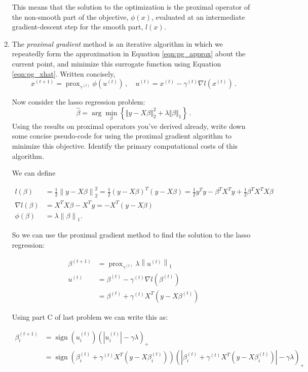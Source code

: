 \documentclass{article}
\DeclareMathOperator*{\sign}{sign}
\DeclareMathOperator*{\prox}{prox}
\newcommand{\norm}[1]{\left\lVert#1\right\rVert}
\newcommand{\enorm}[1]{\Vert #1 \Vert_2}
\begin{document}
\begin{enumerate}[label=(\Alph*)]
{This means that the solution to the optimization is the proximal operator of the non-smooth part of the objective, $\phi(x)$, evaluated at an intermediate gradient-descent step for the smooth part, $l(x)$.

}





\item The \textit{proximal gradient} method is an iterative algorithm in which we repeatedly form the approximation in Equation \ref{eqn:pg_approx} about the current point, and minimize this surrogate function using Equation \ref{eqn:pg_xhat}.  Written concisely,
$$
x^{(t+1)} = \prox_{\gamma^{(t)}} \phi(u^{(t)}) \, , \quad u^{(t)} = x^{(t)} - \gamma^{(t)} \nabla l(x^{(t)}) \, .
$$

Now consider the lasso regression problem:
$$
\hat{\beta} = \arg \min_{\beta} \left\{  \enorm{y - X\beta}^2 + \lambda \Vert \beta \Vert_1 \right\} \, .
$$
Using the results on proximal operators you've derived already, write down some concise pseudo-code for using the proximal gradient algorithm to minimize this objective.  Identify the primary computational costs of this algorithm.

\bigskip
{\color{blue}
We can define 

\begin{align}
l(\beta) &= \frac{1}{2}\norm{y - X\beta}^2_2 = \frac{1}{2}(y - X\beta)^T (y - X\beta) = \frac{1}{2}y^Ty - \beta^T X^T y + \frac{1}{2} \beta^T X^T X \beta \\
\nabla l(\beta) &= X^T X \beta -  X^T y = -X^T(y - X\beta) \\
\phi(\beta) &= \lambda \norm{\beta}_1.
\end{align}

So we can use the proximal gradient method to find the solution to the lasso regression:

\begin{align}
	\beta^{(t+1)} &= \prox_{\gamma^{(t)}} \lambda \norm{u^{(t)}}_1 \\
	u^{(t)} &= \beta^{(t)} - \gamma^{(t)} \nabla l(\beta^{(t)}) \\
	&= \beta^{(t)} + \gamma^{(t)} X^T(y - X\beta^{(t)})
\end{align}

Using part C of last problem we can write this as:

\begin{align}
		\beta^{(t+1)}_i &= \sign(u_i^{(t)})(|u_i^{(t)}| - \gamma \lambda)_+ \\
		&=  \sign(\beta_i^{(t)} + \gamma^{(t)} X^T(y - X\beta_i^{(t)}))(|\beta_i^{(t)} + \gamma^{(t)} X^T(y - X\beta^{(t)}_i)| - \gamma \lambda)_+ 
\end{align}

}
\end{enumerate}
\end{document}
